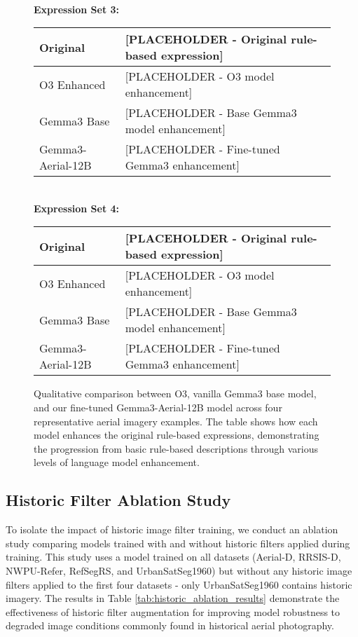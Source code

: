 \begin{figure*}[t]
{{\begin{tabular}{|l|p{12cm}|}
\hline
\end{tabular}\\
\vspace{0.5cm}
\textbf{Expression Set 3:}\\
\begin{tabular}{|l|p{12cm}|}
\hline
Original & [PLACEHOLDER - Original rule-based expression] \\
\hline
O3 Enhanced & [PLACEHOLDER - O3 model enhancement] \\
\hline
Gemma3 Base & [PLACEHOLDER - Base Gemma3 model enhancement] \\
\hline
Gemma3-Aerial-12B & [PLACEHOLDER - Fine-tuned Gemma3 enhancement] \\
\hline
\end{tabular}\\
\vspace{0.5cm}
\textbf{Expression Set 4:}\\
\begin{tabular}{|l|p{12cm}|}
\hline
Original & [PLACEHOLDER - Original rule-based expression] \\
\hline
O3 Enhanced & [PLACEHOLDER - O3 model enhancement] \\
\hline
Gemma3 Base & [PLACEHOLDER - Base Gemma3 model enhancement] \\
\hline
Gemma3-Aerial-12B & [PLACEHOLDER - Fine-tuned Gemma3 enhancement] \\
\hline
\end{tabular}
\vspace{3cm}}}
\caption{Qualitative comparison between O3, vanilla Gemma3 base model, and our fine-tuned Gemma3-Aerial-12B model across four representative aerial imagery examples. The table shows how each model enhances the original rule-based expressions, demonstrating the progression from basic rule-based descriptions through various levels of language model enhancement.}
\label{fig:distillation_comparison}
\end{figure*}


\subsection{Historic Filter Ablation Study}
\label{subsec:historic_ablation}

To isolate the impact of historic image filter training, we conduct an ablation study comparing models trained with and without historic filters applied during training. This study uses a model trained on all datasets (Aerial-D, RRSIS-D, NWPU-Refer, RefSegRS, and UrbanSatSeg1960) but without any historic image filters applied to the first four datasets - only UrbanSatSeg1960 contains historic imagery. The results in Table \ref{tab:historic_ablation_results} demonstrate the effectiveness of historic filter augmentation for improving model robustness to degraded image conditions commonly found in historical aerial photography.

